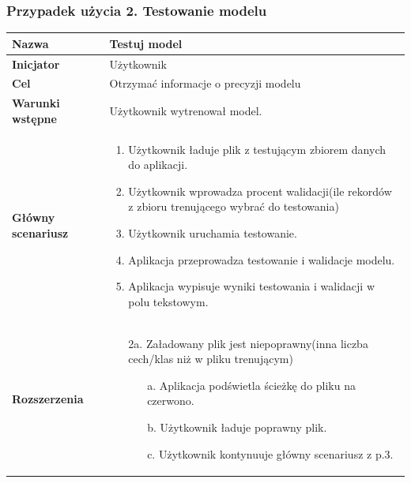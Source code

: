 \documentclass[paper=a4, fontsize=11pt]{scrartcl} %
\numberwithin{equation}{section} %
\numberwithin{figure}{section} %
\begin{document}
\subsubsection{Przypadek użycia 2. Testowanie modelu}
\begin{tabular}{|l|l|}  \hline
    \textbf{Nazwa} & Testuj model \\\hline
    \textbf{Inicjator} & Użytkownik \\\hline
    \textbf{Cel} & Otrzymać informacje o precyzji modelu \\\hline
    \textbf{Warunki wstępne} & Użytkownik wytrenował model.\\\hline
    \textbf{Główny scenariusz} & 
    \begin{minipage}{5in}
        \vskip 4pt
        \begin{enumerate}
            \item Użytkownik ładuje plik z testującym zbiorem danych do aplikacji.
            \item Użytkownik wprowadza procent walidacji(ile rekordów z zbioru trenującego
                wybrać do testowania)
            \item Użytkownik uruchamia testowanie.
            \item Aplikacja przeprowadza testowanie i walidacje modelu.
            \item Aplikacja wypisuje wyniki testowania i walidacji w polu tekstowym.
        \end{enumerate}
        \vskip 4pt
    \end{minipage}
    \\\hline

    \textbf{Rozszerzenia} & 
    \begin{minipage}{5in}
        \vskip 4pt
        \begin{itemize}
            \item[2a.] Załadowany plik jest niepoprawny(inna liczba cech/klas niż w pliku
                trenującym)
                \begin{itemize}
                    \item[a.] Aplikacja podświetla ścieżkę do pliku na czerwono.
                    \item[b.] Użytkownik ładuje poprawny plik.
                    \item[c.] Użytkownik kontynuuje główny scenariusz z p.3.
                \end{itemize}
        \end{itemize}
        \vskip 4pt
    \end{minipage}
    \\\hline
\end{tabular}
\end{document}
